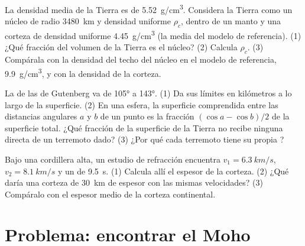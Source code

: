 \begin{exercise}[$\star\star\star$]\label{exo:g11:seismic-structure:13}
La densidad media de la Tierra es de \qty{5.52}{g/cm^3}. Considera la Tierra
como un núcleo de radio \qty{3480}{km} y densidad uniforme $\rho_c$, dentro de
un manto y una corteza de densidad uniforme \qty{4.45}{g/cm^3} (la media del
modelo de referencia). (1) ¿Qué fracción del volumen de la Tierra es el
núcleo? (2) Calcula $\rho_c$. (3) Compárala con la densidad del techo del
núcleo en el modelo de referencia, \qty{9.9}{g/cm^3}, y con la densidad de la
corteza.
\end{exercise}

\begin{exercise}[$\star\star\star$]\label{exo:g11:seismic-structure:14}
La  de las  de Gutenberg va de \ang{105} a \ang{143}.
(1) Da sus límites en kilómetros a lo largo de la superficie. (2) En una
esfera, la superficie comprendida entre las distancias angulares $a$ y $b$ de
un punto es la fracción $(\cos a - \cos
b)/2$ de la superficie total. ¿Qué fracción de la superficie de la Tierra no
recibe ninguna  directa de un terremoto dado? (3) ¿Por qué cada
terremoto tiene su propia ?
\end{exercise}

\begin{exercise}[$\star\star\star$]\label{exo:g11:seismic-structure:15}
Bajo una cordillera alta, un estudio de refracción encuentra $v_1 =
\qty{6.3}{km/s}$, $v_2 = \qty{8.1}{km/s}$ y un  de
\qty{9.5}{s}. (1) Calcula allí el espesor de la corteza. (2) ¿Qué  daría una corteza de \qty{30}{km} de espesor con las mismas
velocidades? (3) Compáralo con el espesor medio de la corteza continental.
\end{exercise}

\section{Problema: encontrar el Moho}


